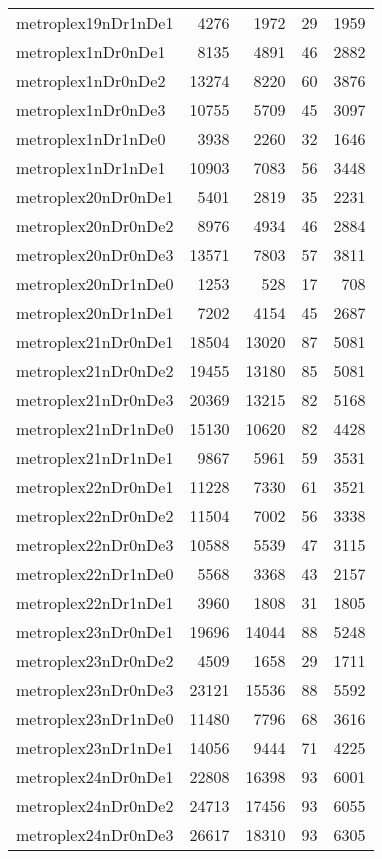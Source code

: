 \begin{longtable}{lrrrr}
metroplex19nDr1nDe1 & 4276 & 1972 & 29 & 1959 \\
metroplex1nDr0nDe1 & 8135 & 4891 & 46 & 2882 \\
metroplex1nDr0nDe2 & 13274 & 8220 & 60 & 3876 \\
metroplex1nDr0nDe3 & 10755 & 5709 & 45 & 3097 \\
metroplex1nDr1nDe0 & 3938 & 2260 & 32 & 1646 \\
metroplex1nDr1nDe1 & 10903 & 7083 & 56 & 3448 \\
metroplex20nDr0nDe1 & 5401 & 2819 & 35 & 2231 \\
metroplex20nDr0nDe2 & 8976 & 4934 & 46 & 2884 \\
metroplex20nDr0nDe3 & 13571 & 7803 & 57 & 3811 \\
metroplex20nDr1nDe0 & 1253 & 528 & 17 & 708 \\
metroplex20nDr1nDe1 & 7202 & 4154 & 45 & 2687 \\
metroplex21nDr0nDe1 & 18504 & 13020 & 87 & 5081 \\
metroplex21nDr0nDe2 & 19455 & 13180 & 85 & 5081 \\
metroplex21nDr0nDe3 & 20369 & 13215 & 82 & 5168 \\
metroplex21nDr1nDe0 & 15130 & 10620 & 82 & 4428 \\
metroplex21nDr1nDe1 & 9867 & 5961 & 59 & 3531 \\
metroplex22nDr0nDe1 & 11228 & 7330 & 61 & 3521 \\
metroplex22nDr0nDe2 & 11504 & 7002 & 56 & 3338 \\
metroplex22nDr0nDe3 & 10588 & 5539 & 47 & 3115 \\
metroplex22nDr1nDe0 & 5568 & 3368 & 43 & 2157 \\
metroplex22nDr1nDe1 & 3960 & 1808 & 31 & 1805 \\
metroplex23nDr0nDe1 & 19696 & 14044 & 88 & 5248 \\
metroplex23nDr0nDe2 & 4509 & 1658 & 29 & 1711 \\
metroplex23nDr0nDe3 & 23121 & 15536 & 88 & 5592 \\
metroplex23nDr1nDe0 & 11480 & 7796 & 68 & 3616 \\
metroplex23nDr1nDe1 & 14056 & 9444 & 71 & 4225 \\
metroplex24nDr0nDe1 & 22808 & 16398 & 93 & 6001 \\
metroplex24nDr0nDe2 & 24713 & 17456 & 93 & 6055 \\
metroplex24nDr0nDe3 & 26617 & 18310 & 93 & 6305 \\

\end{longtable}

